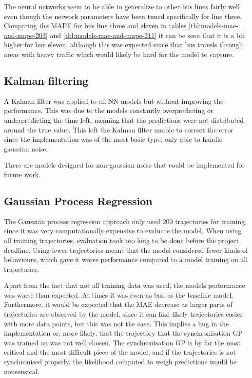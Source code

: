 The neural networks seem to be able to generalize to other bus lines fairly well even though the network parameters have been tuned specifically for line three. Comparing the MAPE for bus line three and eleven in tables \ref{tbl:models-mae-and-mape-203} and \ref{tbl:models-mae-and-mape-211} it can be seen that it is a bit higher for bus eleven, although this was expected since that bus travels through areas with heavy traffic which would likely be hard for the model to capture.

\subsection{Kalman filtering}
A Kalman filter was applied to all NN models but without improving the performance. This was due to the models constantly overpredicting or underpredicting the time left, meaning that the predictions were not distributed around the true value. This left the Kalman filter unable to correct the error since the implementation was of the most basic type, only able to handle gaussian noise. 

There are models designed for non-gaussian noise that could be implemented for future work.

\subsection{Gaussian Process Regression}
The Gaussian process regression approach only used 200 trajectories
for training, since it was very computationally expensive to evaluate
the model. When using all training trajectories, evaluation took too
long to be done before the project deadline. Using fewer trajectories
meant that the model considered fewer kinds of behaviours, which gave
it worse performance compared to a model training on all trajectories.

Apart from the fact that not all training data was used, the models performance was worse than expected. At times it was even as bad as the baseline model. Furthermore, it would be expected that the MAE decrease as larger parts of trajectories are observed by the model, since it can find likely trajectories easier with more data points, but this was not the case. This implies a bug in the implementation or, more likely, that the trajectory that the synchronisation GP was trained on was not well chosen. The synchronisation GP is by far the most critical and the most difficult piece of the model, and if the trajectories is not synchronised properly, the likelihood computed to weigh predictions would be nonsensical. 

